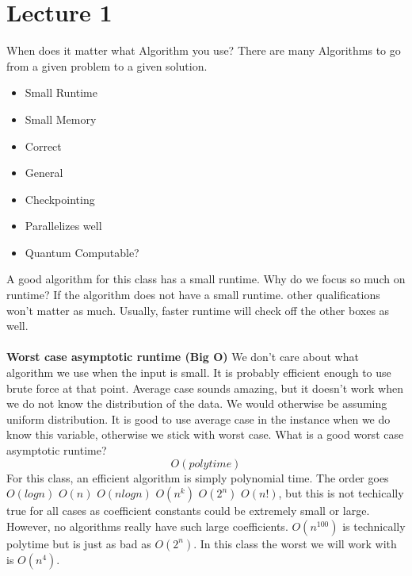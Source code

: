 \documentclass[oneside]{book}
\begin{document}
\chapter{Lecture 1}
When does it matter what Algorithm you use? There are many Algorithms to go from a given problem to a given solution.
\\

\begin{itemize}
    \item Small Runtime
    \item Small Memory
    \item Correct
    \item General
    \item Checkpointing
    \item Parallelizes well
    \item Quantum Computable?
\end{itemize}
A good algorithm for this class has a small runtime.
Why do we focus so much on runtime?
If the algorithm does not have a small runtime. other qualifications won't matter as much. Usually, faster runtime will check off the other boxes as well. 
\\\\
\textbf{Worst case asymptotic runtime (Big O)}
 {
   We don't care about what algorithm we use when the input is small. It is probably efficient enough to use brute force at that point. 
}
 {
    Average case sounds amazing, but it doesn't work when we do not know the distribution of the data. We would otherwise be assuming uniform distribution. It is good to use average case in the instance when we do know this variable, otherwise we stick with worst case.    
}
What is a good worst case asymptotic runtime?\\
\[
O(polytime)
\] 
For this class, an efficient algorithm is simply polynomial time.
The order goes $O(logn)$ $O(n)$ $O(nlogn)$ $O(n^k)$ $O(2^n)$ $O(n!)$, but this is not techically true for all cases as coefficient constants could be extremely small or large. However, no algorithms really have such large coefficients. $O(n^{100})$ is technically polytime but is just as bad as $O(2^n)$. In this class the worst we will work with is $O(n^4)$.
\end{document}
